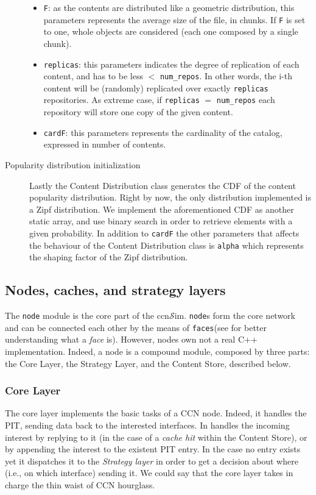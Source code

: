 \documentclass{article}
\newcommand{\ccnsim}{ccn$\mathcal{S}$im}
\begin{document}
\begin{description}
	\begin{itemize}
	    \item \verb|F|: as the contents are distributed like a geometric distribution, this parameters represents the average size of the file, in chunks. If \verb|F| is set to one, whole objects are considered (each one composed by a single chunk).
	    \item \verb|replicas|: this parameters indicates the degree of replication of each content, and has to be less $<$ \verb|num_repos|. In other words, the i-th content will be (randomly) replicated over exactly \verb|replicas| repositories. As extreme case, if \verb|replicas| $=$ \verb|num_repos| each repository will store one copy of the given content. 
	    \item \verb|cardF|: this parameters represents the cardinality of the catalog, expressed in number of contents. 
	\end{itemize}
    \item[Popularity distribution initialization] Lastly the Content Distribution class generates the CDF of the content popularity distribution. Right by now, the only distribution implemented is a Zipf distribution. We implement the aforementioned CDF as another static array, and use binary search in order to retrieve elements with a given probability. In addition to \verb|cardF| the other parameters that affects the behaviour of the Content Distribution class is \verb|alpha| which represents the shaping factor of the Zipf distribution. 
\end{description}
\subsection{Nodes, caches, and strategy layers}
The \verb|node| module is the core part of the \ccnsim. \verb|node|s form the core network and can be connected each other by the means of \verb|faces|(see \cite{jacobson09conext} for better understanding what a \emph{face} is). However, nodes own not a real C++ implementation. Indeed,  a node is a compound module, composed by three parts: the Core Layer, the Strategy Layer, and the Content Store, described below. 
\subsubsection{Core Layer} 
The core layer implements the basic tasks of a CCN node. Indeed, it handles the PIT, sending data back to the interested interfaces. In handles the incoming interest by replying to it (in the case of a \emph{cache hit} within the Content Store), or by  appending the interest to the existent PIT entry. In the case no entry exists yet it dispatches it to the \emph{Strategy layer} in order to get a decision about where (i.e., on which interface) sending it. We could say that the core layer takes in charge the thin waist of CCN hourglass.
\end{document}
